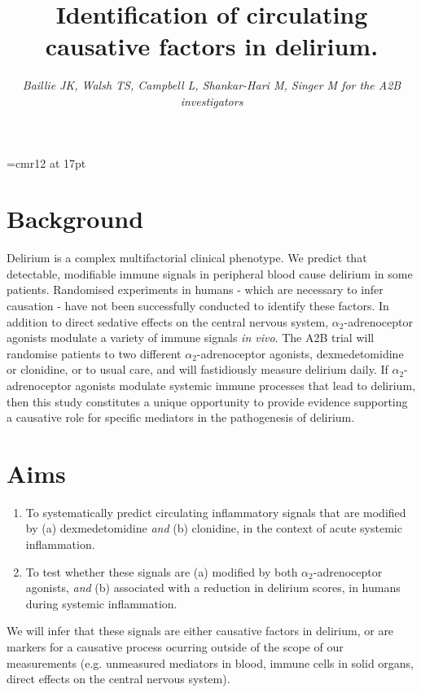 \documentclass[a4paper,11pt,onecolumn]{IEEEtran}
\newcommand{\ataas}{$\alpha_2$-adrenoceptor agonists\xspace}
\begin{document}

\font\customfont=cmr12 at 17pt
\title{{\customfont Identification of circulating causative factors in delirium.}\vspace{-3ex}}
\author{
	\parbox{\linewidth}{\centering
			\emph{
			Baillie JK, Walsh TS, Campbell L, Shankar-Hari M, Singer M for the A2B investigators
			}
			\vspace{-7ex}
	}
}
\date{}
\maketitle

\section*{Background}
Delirium is a complex multifactorial clinical phenotype. We predict that detectable, modifiable immune signals in peripheral blood cause delirium in some patients\cite{teeling_systemic_2009}. Randomised experiments in humans - which are necessary to infer causation - have not been successfully conducted to identify these factors. In addition to direct sedative effects on the central nervous system, \ataas modulate a variety of immune signals \emph{in vivo}\cite{kim_effects_2014,qiao_sedation_2009}. The A2B trial will randomise patients to two different \ataas, dexmedetomidine or clonidine, or to usual care, and will fastidiously measure delirium daily. If \ataas modulate systemic immune processes that lead to delirium, then this study constitutes a unique opportunity to provide evidence supporting a causative role for specific mediators in the pathogenesis of delirium.\par

\section*{Aims}
\begin{enumerate}
	\item{To systematically predict circulating inflammatory signals that are modified by (a) dexmedetomidine \emph{and} (b) clonidine, in the context of acute systemic inflammation.}
	\item{To test whether these signals are (a) modified by both \ataas, \emph{and} (b) associated with a reduction in delirium scores, in humans during systemic inflammation.}
\end{enumerate}
We will infer that these signals are either causative factors in delirium, or are markers for a causative process ocurring outside of the scope of our measurements (e.g. unmeasured mediators in blood, immune cells in solid organs, direct effects on the central nervous system).
\end{document}
